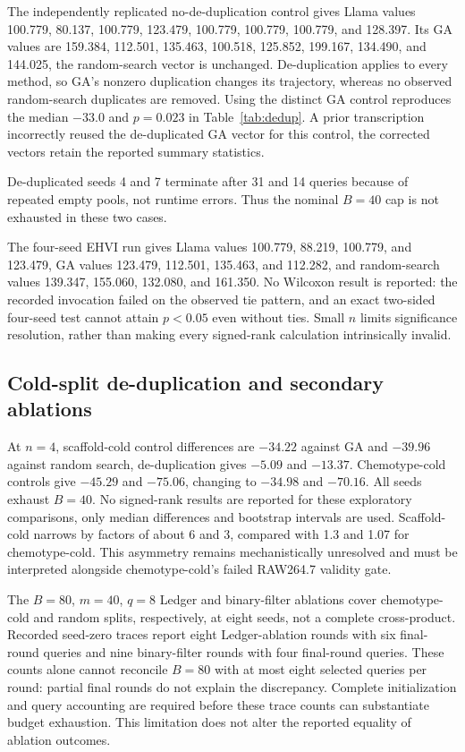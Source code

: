 The independently replicated no-de-duplication control gives Llama values 100.779, 80.137, 100.779, 123.479, 100.779, 100.779, 100.779, and 128.397. Its GA values are 159.384, 112.501, 135.463, 100.518, 125.852, 199.167, 134.490, and 144.025, the random-search vector is unchanged. De-duplication applies to every method, so GA's nonzero duplication changes its trajectory, whereas no observed random-search duplicates are removed. Using the distinct GA control reproduces the median $-33.0$ and $p=0.023$ in Table~\ref{tab:dedup}. A prior transcription incorrectly reused the de-duplicated GA vector for this control, the corrected vectors retain the reported summary statistics.

De-duplicated seeds 4 and 7 terminate after 31 and 14 queries because of repeated empty pools, not runtime errors. Thus the nominal $B=40$ cap is not exhausted in these two cases.

The four-seed EHVI run gives Llama values 100.779, 88.219, 100.779, and 123.479, GA values 123.479, 112.501, 135.463, and 112.282, and random-search values 139.347, 155.060, 132.080, and 161.350. No Wilcoxon result is reported: the recorded invocation failed on the observed tie pattern, and an exact two-sided four-seed test cannot attain $p<0.05$ even without ties. Small $n$ limits significance resolution, rather than making every signed-rank calculation intrinsically invalid.

\subsection{Cold-split de-duplication and secondary ablations}
\label{app:dedup-other-splits}
At $n=4$, scaffold-cold control differences are $-34.22$ against GA and $-39.96$ against random search, de-duplication gives $-5.09$ and $-13.37$. Chemotype-cold controls give $-45.29$ and $-75.06$, changing to $-34.98$ and $-70.16$. All seeds exhaust $B=40$. No signed-rank results are reported for these exploratory comparisons, only median differences and bootstrap intervals are used. Scaffold-cold narrows by factors of about 6 and 3, compared with 1.3 and 1.07 for chemotype-cold. This asymmetry remains mechanistically unresolved and must be interpreted alongside chemotype-cold's failed RAW264.7 validity gate.

The $B=80$, $m=40$, $q=8$ Ledger and binary-filter ablations cover chemotype-cold and random splits, respectively, at eight seeds, not a complete cross-product. Recorded seed-zero traces report eight Ledger-ablation rounds with six final-round queries and nine binary-filter rounds with four final-round queries. These counts alone cannot reconcile $B=80$ with at most eight selected queries per round: partial final rounds do not explain the discrepancy. Complete initialization and query accounting are required before these trace counts can substantiate budget exhaustion. This limitation does not alter the reported equality of ablation outcomes.

